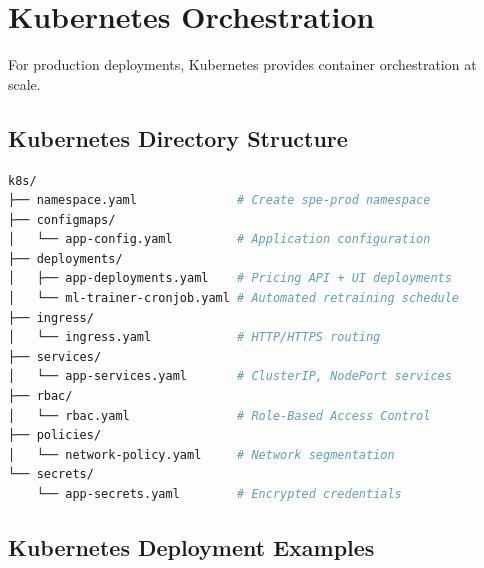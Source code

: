 \documentclass[12pt,a4paper]{report}
\begin{document}
\section{Kubernetes Orchestration}

For production deployments, Kubernetes provides container orchestration at scale.

\subsection{Kubernetes Directory Structure}

\begin{lstlisting}[language=bash, caption={k8s/ directory layout}]
k8s/
├── namespace.yaml              # Create spe-prod namespace
├── configmaps/
│   └── app-config.yaml         # Application configuration
├── deployments/
│   ├── app-deployments.yaml    # Pricing API + UI deployments
│   └── ml-trainer-cronjob.yaml # Automated retraining schedule
├── ingress/
│   └── ingress.yaml            # HTTP/HTTPS routing
├── services/
│   └── app-services.yaml       # ClusterIP, NodePort services
├── rbac/
│   └── rbac.yaml               # Role-Based Access Control
├── policies/
│   └── network-policy.yaml     # Network segmentation
└── secrets/
    └── app-secrets.yaml        # Encrypted credentials
\end{lstlisting}

\subsection{Kubernetes Deployment Examples}
\end{document}
